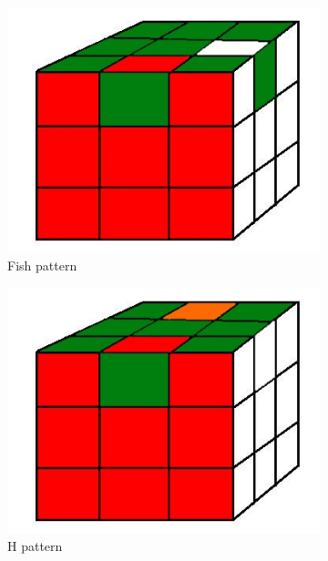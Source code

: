 \documentclass[a4paper,11pt]{kth-mag}
\begin{document}
\begin{figure}[bh]
	\centering
	\begin{subfigure}[!b]{0.3\textwidth}
		\includegraphics[width=\textwidth]{figs/fish-pattern.jpg}
		\caption{Fish pattern}
		\label{fig_15}
	\end{subfigure}
	\begin{subfigure}[!b]{0.3\textwidth}
		\includegraphics[width=\textwidth]{figs/H-pattern.jpg}
		\caption{H pattern}
		\label{fig_16}
	\end{subfigure}
	\caption{}
\end{figure}
\end{document}
